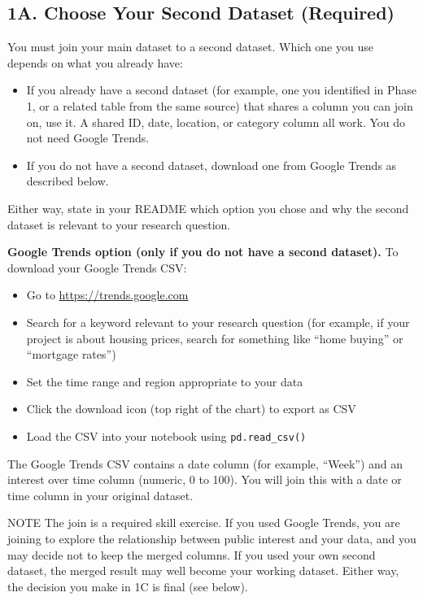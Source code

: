 \documentclass[11pt,letterpaper]{article}
\newcommand{\code}[1]{\texttt{#1}}
\begin{document}
\subsection{1A. Choose Your Second Dataset (Required)}

You must join your main dataset to a second dataset. Which one you use depends on what you already have:
\begin{itemize}
  \item If you already have a second dataset (for example, one you identified in Phase 1, or a related table from the same source) that shares a column you can join on, use it. A shared ID, date, location, or category column all work. You do not need Google Trends.
  \item If you do not have a second dataset, download one from Google Trends as described below.
\end{itemize}

Either way, state in your README which option you chose and why the second dataset is relevant to your research question.

\textbf{Google Trends option (only if you do not have a second dataset).} To download your Google Trends CSV:
\begin{itemize}
  \item Go to \url{https://trends.google.com}
  \item Search for a keyword relevant to your research question (for example, if your project is about housing prices, search for something like ``home buying'' or ``mortgage rates'')
  \item Set the time range and region appropriate to your data
  \item Click the download icon (top right of the chart) to export as CSV
  \item Load the CSV into your notebook using \code{pd.read\_csv()}
\end{itemize}

The Google Trends CSV contains a date column (for example, ``Week'') and an interest over time column (numeric, 0 to 100). You will join this with a date or time column in your original dataset.

\begin{callout}{NOTE}
The join is a required skill exercise. If you used Google Trends, you are joining to explore the relationship between public interest and your data, and you may decide not to keep the merged columns. If you used your own second dataset, the merged result may well become your working dataset. Either way, the decision you make in 1C is final (see below).
\end{callout}
\end{document}
